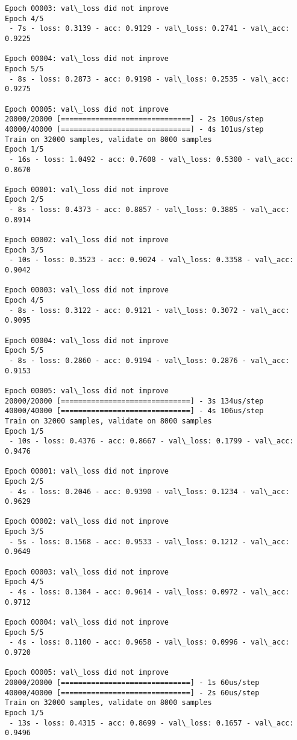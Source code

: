 \documentclass[11pt]{article}
\begin{document}
\begin{Verbatim}[commandchars=\\\{\}]
Epoch 00003: val\_loss did not improve
Epoch 4/5
 - 7s - loss: 0.3139 - acc: 0.9129 - val\_loss: 0.2741 - val\_acc: 0.9225

Epoch 00004: val\_loss did not improve
Epoch 5/5
 - 8s - loss: 0.2873 - acc: 0.9198 - val\_loss: 0.2535 - val\_acc: 0.9275

Epoch 00005: val\_loss did not improve
20000/20000 [==============================] - 2s 100us/step
40000/40000 [==============================] - 4s 101us/step
Train on 32000 samples, validate on 8000 samples
Epoch 1/5
 - 16s - loss: 1.0492 - acc: 0.7608 - val\_loss: 0.5300 - val\_acc: 0.8670

Epoch 00001: val\_loss did not improve
Epoch 2/5
 - 8s - loss: 0.4373 - acc: 0.8857 - val\_loss: 0.3885 - val\_acc: 0.8914

Epoch 00002: val\_loss did not improve
Epoch 3/5
 - 10s - loss: 0.3523 - acc: 0.9024 - val\_loss: 0.3358 - val\_acc: 0.9042

Epoch 00003: val\_loss did not improve
Epoch 4/5
 - 8s - loss: 0.3122 - acc: 0.9121 - val\_loss: 0.3072 - val\_acc: 0.9095

Epoch 00004: val\_loss did not improve
Epoch 5/5
 - 8s - loss: 0.2860 - acc: 0.9194 - val\_loss: 0.2876 - val\_acc: 0.9153

Epoch 00005: val\_loss did not improve
20000/20000 [==============================] - 3s 134us/step
40000/40000 [==============================] - 4s 106us/step
Train on 32000 samples, validate on 8000 samples
Epoch 1/5
 - 10s - loss: 0.4376 - acc: 0.8667 - val\_loss: 0.1799 - val\_acc: 0.9476

Epoch 00001: val\_loss did not improve
Epoch 2/5
 - 4s - loss: 0.2046 - acc: 0.9390 - val\_loss: 0.1234 - val\_acc: 0.9629

Epoch 00002: val\_loss did not improve
Epoch 3/5
 - 5s - loss: 0.1568 - acc: 0.9533 - val\_loss: 0.1212 - val\_acc: 0.9649

Epoch 00003: val\_loss did not improve
Epoch 4/5
 - 4s - loss: 0.1304 - acc: 0.9614 - val\_loss: 0.0972 - val\_acc: 0.9712

Epoch 00004: val\_loss did not improve
Epoch 5/5
 - 4s - loss: 0.1100 - acc: 0.9658 - val\_loss: 0.0996 - val\_acc: 0.9720

Epoch 00005: val\_loss did not improve
20000/20000 [==============================] - 1s 60us/step
40000/40000 [==============================] - 2s 60us/step
Train on 32000 samples, validate on 8000 samples
Epoch 1/5
 - 13s - loss: 0.4315 - acc: 0.8699 - val\_loss: 0.1657 - val\_acc: 0.9496


\end{Verbatim}
\end{document}
